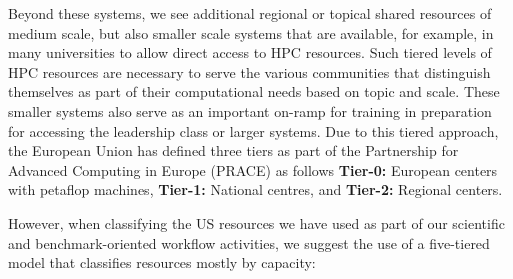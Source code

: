 \documentclass[utf8]{FrontiersinVancouver} %
\begin{document}
Beyond these systems, we see additional regional or topical shared resources of medium scale, but also smaller scale systems that are available, for example, in many universities to allow direct access to HPC resources. Such tiered levels of HPC resources are necessary to serve the various communities that distinguish themselves as part of their computational needs based on topic and scale. These smaller systems also serve as an important on-ramp for training in preparation for accessing the leadership class or larger systems.  Due to this tiered approach, the European Union has defined three tiers as part of the Partnership for Advanced Computing in Europe (PRACE) \cite{www-prace,prace-fact} as follows {\bf Tier-0:} European centers with petaflop machines, {\bf Tier-1:} National centres, and {\bf Tier-2:} Regional centers.
  
However, when classifying the US resources we have used as part of our scientific and benchmark-oriented workflow activities, we suggest the use of a five-tiered model that classifies resources mostly by capacity:
\end{document}
